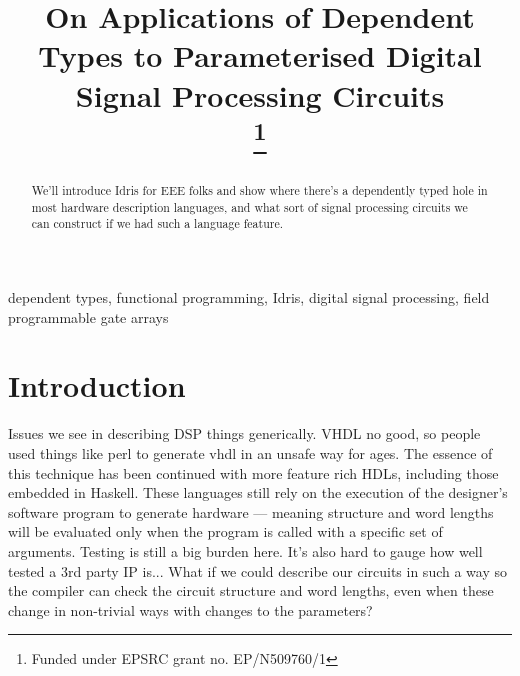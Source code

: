 \documentclass[conference]{IEEEtran}
\begin{document}
\title{On Applications of Dependent Types to Parameterised Digital Signal
  Processing Circuits \\
\thanks{Funded under EPSRC grant no. EP/N509760/1} }

\author{
\and
{}
\and
{}
}

\maketitle

\begin{abstract}
  We'll introduce Idris for EEE folks and show where there's a dependently typed
  hole in most hardware description languages, and what sort of signal
  processing circuits we can construct if we had such a language feature.
\end{abstract}

\begin{IEEEkeywords}
dependent types, functional programming, Idris, digital signal processing, field programmable gate arrays  
\end{IEEEkeywords}

\section{Introduction}

Issues we see in describing DSP things generically. VHDL no good, so people used
things like perl to generate vhdl in an unsafe way for ages. The essence of this
technique has been continued with more feature rich HDLs, including those
embedded in Haskell. These languages still rely on the execution of the
designer's software program to generate hardware --- meaning structure and
word lengths will be evaluated only when the program is called with a specific
set of arguments. Testing is still a big burden here. It's also hard to gauge
how well tested a 3rd party IP is... What if we could describe our circuits in
such a way so the compiler can check the circuit structure and word lengths, even
when these change in non-trivial ways with changes to the parameters?
\end{document}
